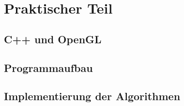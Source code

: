 \chapter{Praktischer Teil}
\thispagestyle{fancy} %

\section{C++ und OpenGL}
\blindtext 


\section{Programmaufbau}
\blindtext 


\section{Implementierung der Algorithmen}
\blindtext 


